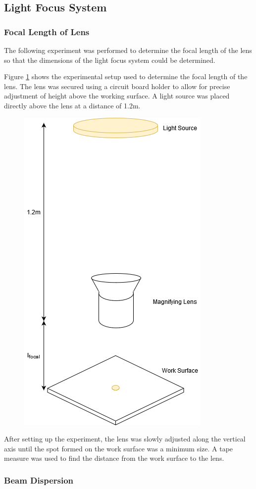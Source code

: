 


\subsection{Light Focus System}
\subsubsection{Focal Length of Lens}
\label{exp:focal_length}

The following experiment was performed to determine the focal length of the lens so that the dimensions of the light focus system could be determined.

Figure \ref{fig:focal_length_experiemnt} shows the experimental setup used to determine the focal length of the lens. The lens was secured using a circuit board holder to allow for precise adjustment of height above the working surface. A light source was placed directly above the lens at a distance of 1.2m.

\begin{figure}[H]
	\centering
	\includegraphics[width=.4\linewidth]{figures/experimentation/focal_length.png}
	\label{fig:focal_length_experiemnt}
\end{figure}

After setting up the experiment, the lens was slowly adjusted along the vertical axis until the spot formed on the work surface was a minimum size. A tape measure was used to find the distance from the work surface to the lens.

\subsubsection{Beam Dispersion}

